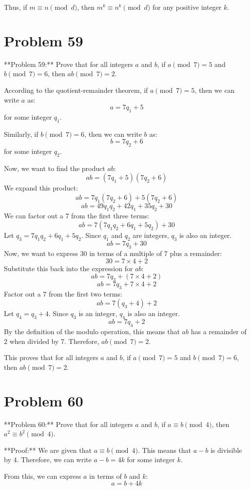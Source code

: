 \documentclass{article}
\begin{document}
Thus, if $m \equiv n \pmod{d}$, then $m^k \equiv n^k \pmod{d}$ for any positive integer $k$.

\newpage

\section*{Problem 59}
**Problem 59:** Prove that for all integers $a$ and $b$, if $a \pmod{7} = 5$ and $b \pmod{7} = 6$, then $ab \pmod{7} = 2$.

According to the quotient-remainder theorem, if $a \pmod{7} = 5$, then we can write $a$ as:
$$a = 7q_1 + 5$$
for some integer $q_1$.

Similarly, if $b \pmod{7} = 6$, then we can write $b$ as:
$$b = 7q_2 + 6$$
for some integer $q_2$.

Now, we want to find the product $ab$:
$$ab = (7q_1 + 5)(7q_2 + 6)$$
We expand this product:
$$ab = 7q_1(7q_2 + 6) + 5(7q_2 + 6)$$
$$ab = 49q_1q_2 + 42q_1 + 35q_2 + 30$$
We can factor out a 7 from the first three terms:
$$ab = 7(7q_1q_2 + 6q_1 + 5q_2) + 30$$
Let $q_3 = 7q_1q_2 + 6q_1 + 5q_2$. Since $q_1$ and $q_2$ are integers, $q_3$ is also an integer.
$$ab = 7q_3 + 30$$
Now, we want to express 30 in terms of a multiple of 7 plus a remainder:
$$30 = 7 \times 4 + 2$$
Substitute this back into the expression for $ab$:
$$ab = 7q_3 + (7 \times 4 + 2)$$
$$ab = 7q_3 + 7 \times 4 + 2$$
Factor out a 7 from the first two terms:
$$ab = 7(q_3 + 4) + 2$$
Let $q_4 = q_3 + 4$. Since $q_3$ is an integer, $q_4$ is also an integer.
$$ab = 7q_4 + 2$$
By the definition of the modulo operation, this means that $ab$ has a remainder of 2 when divided by 7.
Therefore, $ab \pmod{7} = 2$.

This proves that for all integers $a$ and $b$, if $a \pmod{7} = 5$ and $b \pmod{7} = 6$, then $ab \pmod{7} = 2$.

\newpage

\section*{Problem 60}
**Problem 60:** Prove that for all integers $a$ and $b$, if $a \equiv b \pmod{4}$, then $a^2 \equiv b^2 \pmod{4}$.

**Proof:**
We are given that $a \equiv b \pmod{4}$. This means that $a-b$ is divisible by 4.
Therefore, we can write $a-b = 4k$ for some integer $k$.

From this, we can express $a$ in terms of $b$ and $k$:
$$a = b + 4k$$
\end{document}
